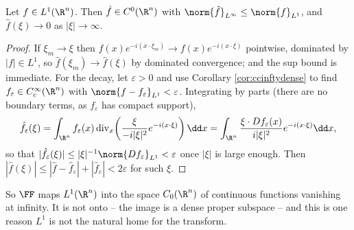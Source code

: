 \begin{lemma}\label{lem:riemannlebesgue}
	Let $f \in L^1(\R^n)$. Then $\hat f \in C^0(\R^n)$ with $\norm{\hat f}_{L^\infty}\le\norm{f}_{L^1}$, and $\hat f(\xi)\to 0$ as $|\xi|\to\infty$.
\end{lemma}

\begin{proof}
	If $\xi_m \to \xi$ then $f(x)e^{-i(x\cdot\xi_m)}\to f(x)e^{-i(x\cdot\xi)}$ pointwise, dominated by $|f| \in L^1$, so $\hat f(\xi_m)\to\hat f(\xi)$ by dominated convergence; and the sup bound is immediate. For the decay, let $\varepsilon > 0$ and use Corollary \ref{cor:ccinftydense} to find $f_\varepsilon \in C_c^\infty(\R^n)$ with $\norm{f - f_\varepsilon}_{L^1}<\varepsilon$. Integrating by parts (there are no boundary terms, as $f_\varepsilon$ has compact support),
	$$\hat f_\varepsilon(\xi) = \int_{\R^n} f_\varepsilon(x) \operatorname{div}_x\!\left( \frac{\xi}{-i|\xi|^2}e^{-i(x\cdot\xi)}\right) \dd x = \int_{\R^n}\frac{\xi \cdot Df_\varepsilon(x)}{i|\xi|^2}e^{-i(x\cdot\xi)}\dd x,$$
	so that $|\hat f_\varepsilon(\xi)|\le |\xi|^{-1}\norm{Df_\varepsilon}_{L^1} < \varepsilon$ once $|\xi|$ is large enough. Then $|\hat f(\xi)|\le|\hat f - \hat f_\varepsilon|+|\hat f_\varepsilon| < 2\varepsilon$ for such $\xi$.
\end{proof}

So $\FF$ maps $L^1(\R^n)$ into the space $C_0(\R^n)$ of continuous functions vanishing at infinity. It is not onto -- the image is a dense proper subspace -- and this is one reason $L^1$ is not the natural home for the transform.

